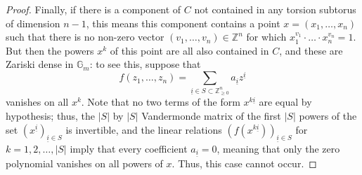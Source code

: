 \documentclass[10pt,a4paper]{amsart}
\newcommand{\G}{\mathbb{G}}
\newcommand{\Z}{\mathbb{Z}}
\begin{document}
\begin{proof}
        Finally, if there is a component of $C$ not contained in any torsion subtorus of dimension $n-1$, this means this component contains a point $x=(x_1,\ldots, x_n)$ such that there is no non-zero vector $(v_1,\ldots, v_n)\in \Z^n$ for which $x_1^{v_1}\cdot \ldots \cdot x_n^{v_n}=1$. But then the powers $x^k$ of this point are all also contained in $C$, and these are Zariski dense in $\G_m$: to see this, suppose that
        \[
            f(z_1,\ldots, z_n) = \sum_{\underline{i}\in S\subset \Z_{\ge 0}^n} a_{\underline{i}} z^{\underline{i}}
        \]
        vanishes on all $x^k$. Note that no two terms of the form $x^{k\underline{i}}$ are equal by hypothesis; thus, the $|S|$ by $|S|$ Vandermonde matrix of the first $|S|$ powers of the set $(x^{\underline{i}})_{\underline{i}\in S}$ is invertible, and the linear relations $(f(x^{k \underline{i}}))_{\underline{i}\in S}$ for $k=1,2,\ldots, |S|$ imply that every coefficient $a_{\underline{i}}=0$, meaning that only the zero polynomial vanishes on all powers of $x$. Thus, this case cannot occur.
    \end{proof}
\end{document}
